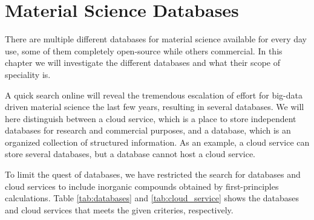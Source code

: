 \chapter{Material Science Databases}
There are multiple different databases for material science available for every day use, some of them completely open-source while others commercial. In this chapter we will investigate the different databases and what their scope of speciality is.

A quick search online will reveal the tremendous escalation of effort for big-data driven material science the last few years, resulting in several databases. We will here distinguish between a cloud service, which is a place to store independent databases for research and commercial purposes, and a database, which is an organized collection of structured information. As an example, a cloud service can store several databases, but a database cannot host a cloud service.

To limit the quest of databases, we have restricted the search for databases and cloud services to include inorganic compounds obtained by first-principles calculations. Table \ref{tab:databases} and \ref{tab:cloud_service} shows the databases and cloud services that meets the given criteries, respectively.





\clearpage

